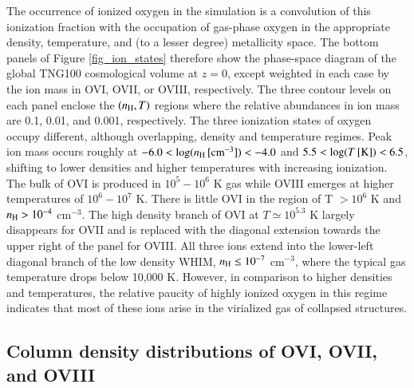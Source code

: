 \documentclass[useAMS,usenatbib]{mnras}
\newcommand{\ovi}{OVI\xspace}
\newcommand{\ovii}{OVII\xspace}
\newcommand{\oviii}{OVIII\xspace}
\begin{document}
The occurrence of ionized oxygen in the simulation is a convolution of this ionization fraction with the occupation of gas-phase oxygen in the appropriate density, temperature, and (to a lesser degree) metallicity space. The bottom panels of Figure \ref{fig_ion_states} therefore show the phase-space diagram of the global TNG100 cosmological volume at $z=0$, except weighted in each case by the ion mass in \ovi, \ovii, or \oviii, respectively. The three contour levels on each panel enclose the $(n_{\rm H},T)$ regions where the relative abundances in ion mass are 0.1, 0.01, and 0.001, respectively. The three ionization states of oxygen occupy different, although overlapping, density and temperature regimes. Peak ion mass occurs roughly at $-6.0 < \log(n_{\rm H} \,[\rm{cm}^{-3}]) < -4.0$ and $5.5 < \log(T \,[\rm{K}]) < 6.5$, shifting to lower densities and higher temperatures with increasing ionization. The bulk of \ovi is produced in $10^5 - 10^6$ K gas while \oviii emerges at higher temperatures of $10^6 -10^7$ K. There is little \ovi in the region of T $> 10^6$ K and $n_{\rm H} > 10^{-4}$ cm$^{-3}$. The high density branch of \ovi at $T \simeq 10^{5.3}$ K largely disappears for \ovii and is replaced with the diagonal extension towards the upper right of the panel for \oviii. All three ions extend into the lower-left diagonal branch of the low density WHIM, $n_{\rm H} \le 10^{-7}$ cm$^{-3}$, where the typical gas temperature drops below 10,000 K. However, in comparison to higher densities and temperatures, the relative paucity of highly ionized oxygen in this regime indicates that most of these ions arise in the virialized gas of collapsed structures.

\subsection{Column density distributions of OVI, OVII, and OVIII} \label{subsec_cddfs}
\end{document}
